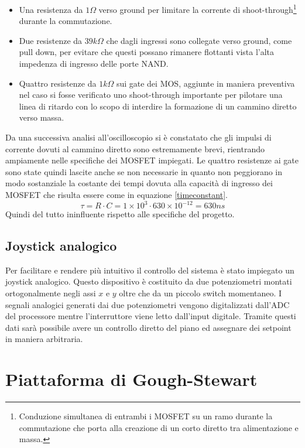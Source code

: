 \documentclass[12pt,twoside,openright]{report}
\begin{document}
\begin{itemize}
\item Una resistenza da $1\Omega$ verso ground per limitare la corrente di shoot-through\footnote{Conduzione simultanea di entrambi i MOSFET su un ramo durante la commutazione che porta alla creazione di un corto diretto tra alimentazione e massa.} durante la commutazione.
\item Due resistenze da $39k\Omega$ che dagli ingressi sono collegate verso ground, come pull down, per evitare che questi possano rimanere flottanti vista l'alta impedenza di ingresso delle porte NAND.
\item Quattro resistenze da $1k\Omega$ sui gate dei MOS, aggiunte in maniera preventiva nel caso si fosse verificato uno shoot-through importante per pilotare una linea di ritardo con lo scopo di interdire la formazione di un cammino diretto verso massa.
\end{itemize}
Da una successiva analisi all'oscilloscopio si è constatato che gli impulsi di corrente dovuti al cammino diretto sono estremamente brevi, rientrando ampiamente nelle specifiche dei MOSFET impiegati. Le quattro resistenze ai gate sono state quindi lascite anche se non necessarie in quanto non peggiorano in modo sostanziale la costante dei tempi dovuta alla capacità di ingresso dei MOSFET che risulta essere come in equazione \ref{timeconstant}.
\begin{equation}\label{timeconstant}
\tau=R\cdot C = 1\times 10^3 \cdot 630\times 10^{-12}=630 ns
\end{equation}
Quindi del tutto ininfluente rispetto alle specifiche del progetto.

\section{Joystick analogico}\label{joystick}
Per facilitare e rendere più intuitivo il controllo del sistema è stato impiegato un joystick analogico. Questo dispositivo è costituito da due potenziometri montati ortogonalmente negli assi $x$ e $y$ oltre che da un piccolo switch momentaneo. I segnali analogici generati dai due potenziometri vengono digitalizzati dall'ADC del processore mentre l'interruttore viene letto dall'input digitale. Tramite questi dati sarà possibile avere un controllo diretto del piano ed assegnare dei setpoint in maniera arbitraria.

\newpage

\chapter{Piattaforma di Gough-Stewart}\label{pianostewart}
\end{document}
